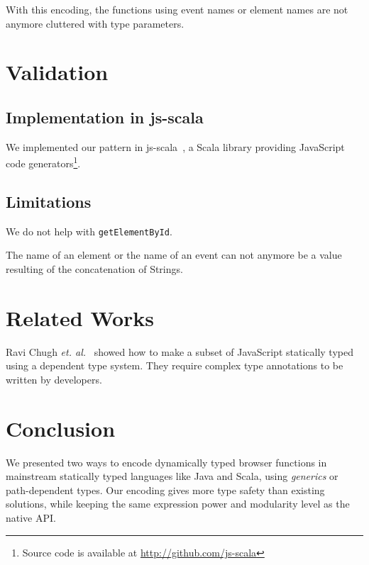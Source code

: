 \documentclass{llncs}
\newcommand{\jscode}[1]{\lstinline[language=JavaScript]|#1|}
\begin{document}
With this encoding, the functions using event names or element names are not anymore cluttered with type parameters.

\section{Validation}
\label{sec-validation}

\subsection{Implementation in js-scala}

We implemented our pattern in js-scala~\cite{Kossakowski12_JsDESL}, a Scala library providing JavaScript code generators\footnote{Source code is available at \href{http://github.com/js-scala}{http://github.com/js-scala}}.

\subsection{Limitations}

We do not help with \jscode{getElementById}.

The name of an element or the name of an event can not anymore be a value resulting of the concatenation of Strings.

\section{Related Works}
\label{sec-related}

Ravi Chugh \emph{et. al.}~\cite{Chugh12_DJS} showed how to make a subset of JavaScript statically typed using a dependent type system. They require complex type annotations to be written by developers.

\section{Conclusion}
\label{sec-conclusion}

We presented two ways to encode dynamically typed browser functions in mainstream statically typed languages like Java and Scala, using \emph{generics} or path-dependent types. Our encoding gives more type safety than existing solutions, while keeping the same expression power and modularity level as the native API.



\end{document}
